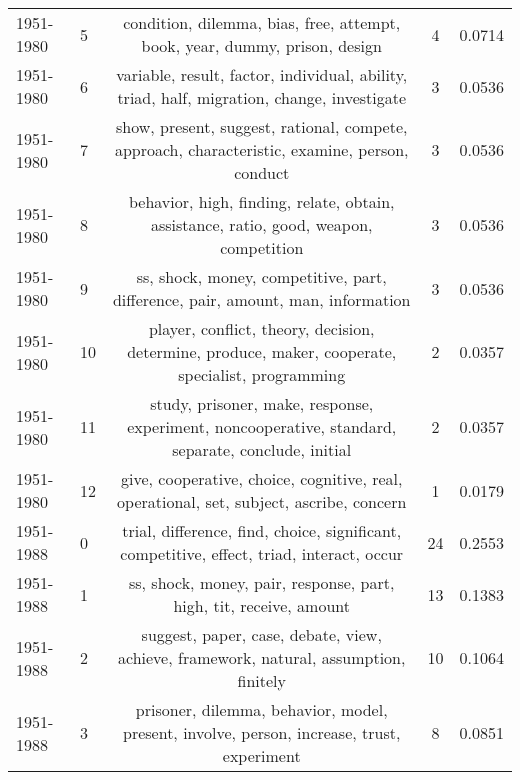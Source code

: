 \begin{tabular}{llccc}
 1951-1980 &               5 &                                    condition, dilemma, bias, free, attempt, book, year, dummy, prison, design &                4 &                  0.0714 \\
 1951-1980 &               6 &                    variable, result, factor, individual, ability, triad, half, migration, change, investigate &                3 &                  0.0536 \\
 1951-1980 &               7 &                 show, present, suggest, rational, compete, approach, characteristic, examine, person, conduct &                3 &                  0.0536 \\
 1951-1980 &               8 &                         behavior, high, finding, relate, obtain, assistance, ratio, good, weapon, competition &                3 &                  0.0536 \\
 1951-1980 &               9 &                               ss, shock, money, competitive, part, difference, pair, amount, man, information &                3 &                  0.0536 \\
 1951-1980 &              10 &             player, conflict, theory, decision, determine, produce, maker, cooperate, specialist, programming &                2 &                  0.0357 \\
 1951-1980 &              11 &            study, prisoner, make, response, experiment, noncooperative, standard, separate, conclude, initial &                2 &                  0.0357 \\
 1951-1980 &              12 &                       give, cooperative, choice, cognitive, real, operational, set, subject, ascribe, concern &                1 &                  0.0179 \\
 \midrule
 1951-1988 &               0 &                     trial, difference, find, choice, significant, competitive, effect, triad, interact, occur &               24 &                  0.2553 \\
 1951-1988 &               1 &                                            ss, shock, money, pair, response, part, high, tit, receive, amount &               13 &                  0.1383 \\
 1951-1988 &               2 &                         suggest, paper, case, debate, view, achieve, framework, natural, assumption, finitely &               10 &                  0.1064 \\
 1951-1988 &               3 &                     prisoner, dilemma, behavior, model, present, involve, person, increase, trust, experiment &                8 &                  0.0851 \\

\end{tabular}
